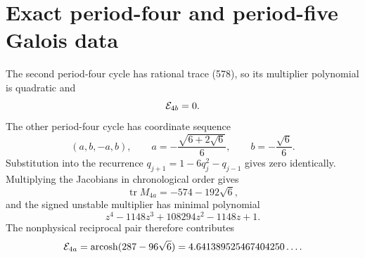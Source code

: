 \section{Exact period-four and period-five Galois data}

The second period-four cycle has rational trace (578), so its multiplier
polynomial is quadratic and
\begin{equation}\label{eq:E4b}
 \mathcal E_{4b}=0.
\end{equation}
The other period-four cycle has coordinate sequence
\begin{equation}\label{eq:p4a-coordinates}
 (a,b,-a,b),\qquad
 a=-\frac{\sqrt{6+2\sqrt6}}6,\qquad b=-\frac{\sqrt6}{6}.
\end{equation}
Substitution into the recurrence
\(q_{j+1}=1-6q_j^2-q_{j-1}\) gives zero identically.  Multiplying the
Jacobians in chronological order gives
\begin{equation}\label{eq:p4a-trace}
 \operatorname{tr}M_{4a}=-574-192\sqrt6,
\end{equation}
and the signed unstable multiplier has minimal polynomial
\begin{equation}\label{eq:p4a-minpoly}
 z^4-1148z^3+108294z^2-1148z+1.
\end{equation}
The nonphysical reciprocal pair therefore contributes
\begin{equation}\label{eq:E4a}
 \mathcal E_{4a}=\operatorname{arcosh}(287-96\sqrt6)
 =4.641389525467404250\ldots.
\end{equation}

